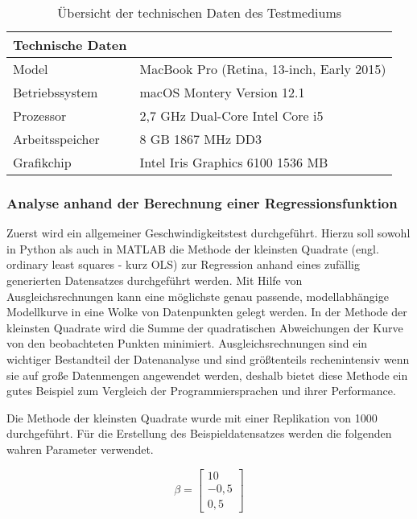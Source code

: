\begin{table}[H]
	\centering
	\begin{tabular}{|l|l|}
		\multicolumn{1}{l}{\textbf{Technische Daten}} & \multicolumn{1}{l}{}                       \\ 
		\hline
		Model                                         & MacBook Pro (Retina, 13-inch, Early 2015)  \\ 
		\hline
		Betriebssystem                                & macOS Montery Version 12.1                 \\ 
		\hline
		Prozessor                                     & 2,7 GHz Dual-Core Intel Core i5            \\ 
		\hline
		Arbeitsspeicher                               & 8 GB 1867 MHz DD3                          \\ 
		\hline
		Grafikchip                                    & Intel Iris Graphics 6100 1536 MB           \\
		\hline
	\end{tabular}
	\caption{Übersicht der technischen Daten des Testmediums}
\end{table}

\subsubsection{Analyse anhand der Berechnung einer Regressionsfunktion}

Zuerst wird ein allgemeiner Geschwindigkeitstest durchgeführt. Hierzu soll sowohl in Python als auch in MATLAB die Methode der kleinsten Quadrate (engl. ordinary least squares - kurz OLS) zur Regression anhand eines zufällig generierten Datensatzes durchgeführt werden. Mit Hilfe von Ausgleichsrechnungen kann eine möglichste genau passende, modellabhängige Modellkurve in eine Wolke von Datenpunkten gelegt werden. In der Methode der kleinsten Quadrate wird die Summe der quadratischen Abweichungen der Kurve von den beobachteten Punkten minimiert. Ausgleichsrechnungen sind ein wichtiger Bestandteil der Datenanalyse und sind größtenteils rechenintensiv wenn sie auf große Datenmengen angewendet werden, deshalb bietet diese Methode ein gutes Beispiel zum Vergleich der Programmiersprachen und ihrer Performance.\cite{kleinsteQuadrate}

Die Methode der kleinsten Quadrate wurde mit einer Replikation von 1000 durchgeführt. Für die Erstellung des Beispieldatensatzes werden die folgenden wahren Parameter verwendet.

\begin{equation}
	\beta = \begin{bmatrix}
	 	10\\ 
	 	-0,5\\ 
	 	0,5
	\end{bmatrix}
\end{equation} 

